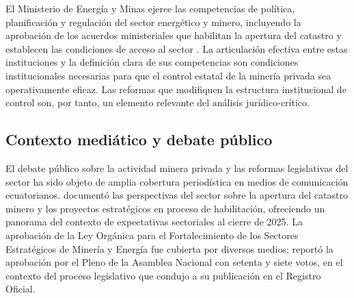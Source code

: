 El Ministerio de Energía y Minas ejerce las competencias de política, planificación y regulación del sector energético y minero, incluyendo la aprobación de los acuerdos ministeriales que habilitan la apertura del catastro y establecen las condiciones de acceso al sector \parencite{arcom_resolucion_0029_2025}. La articulación efectiva entre estas instituciones y la definición clara de sus competencias son condiciones institucionales necesarias para que el control estatal de la minería privada sea operativamente eficaz. Las reformas que modifiquen la estructura institucional de control son, por tanto, un elemento relevante del análisis jurídico-crítico.

\subsection{Contexto mediático y debate público}

El debate público sobre la actividad minera privada y las reformas legislativas del sector ha sido objeto de amplia cobertura periodística en medios de comunicación ecuatorianos. \textcite{lahora_boom_minero_2025} documentó las perspectivas del sector sobre la apertura del catastro minero y los proyectos estratégicos en proceso de habilitación, ofreciendo un panorama del contexto de expectativas sectoriales al cierre de 2025. La aprobación de la Ley Orgánica para el Fortalecimiento de los Sectores Estratégicos de Minería y Energía fue cubierta por diversos medios; \textcite{primicias_aprobacion_2026} reportó la aprobación por el Pleno de la Asamblea Nacional con setenta y siete votos, en el contexto del proceso legislativo que condujo a su publicación en el Registro Oficial.


